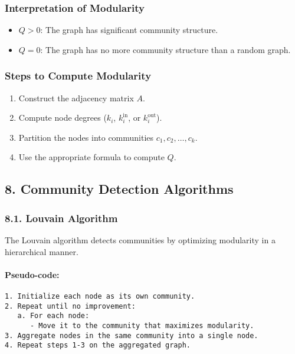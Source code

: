 \documentclass[12pt, a4paper,oneside]{book}
\begin{document}
\subsubsection*{Interpretation of Modularity}
\begin{itemize}
    \item \( Q > 0 \): The graph has significant community structure.
    \item \( Q = 0 \): The graph has no more community structure than a random graph.
\end{itemize}

\subsubsection*{Steps to Compute Modularity}
\begin{enumerate}
    \item Construct the adjacency matrix \( A \).
    \item Compute node degrees (\( k_i \), \( k_i^{\text{in}} \), or \( k_i^{\text{out}} \)).
    \item Partition the nodes into communities \( c_1, c_2, \dots, c_k \).
    \item Use the appropriate formula to compute \( Q \).
\end{enumerate}



\subsection*{8. Community Detection Algorithms}

\subsubsection*{8.1. Louvain Algorithm}
The Louvain algorithm detects communities by optimizing modularity in a hierarchical manner.

\paragraph{Pseudo-code:}
\begin{verbatim}
1. Initialize each node as its own community.
2. Repeat until no improvement:
   a. For each node:
      - Move it to the community that maximizes modularity.
3. Aggregate nodes in the same community into a single node.
4. Repeat steps 1-3 on the aggregated graph.
\end{verbatim}
\end{document}
